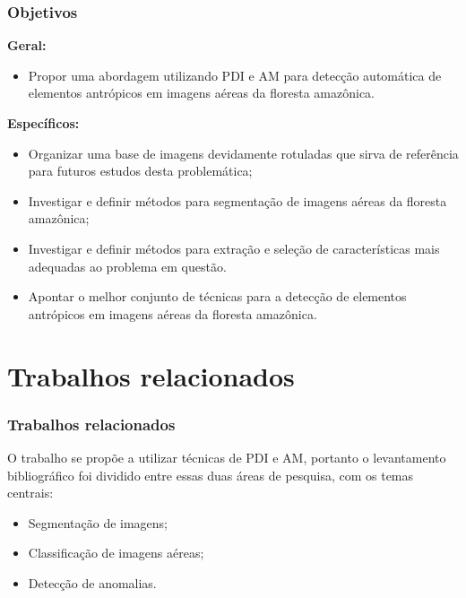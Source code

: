 \documentclass[t]{beamer}
\begin{document}
\begin{frame}[c]
\frametitle{Objetivos}

\textbf{Geral:}

\begin{itemize}
	\item Propor uma abordagem utilizando PDI e AM para detecção automática de elementos antrópicos em imagens aéreas da floresta amazônica.
\end{itemize}

\textbf{Específicos:}

\begin{itemize}
    \item Organizar uma base de imagens devidamente rotuladas que sirva de referência para futuros estudos desta problemática;
    \item Investigar e definir métodos para segmentação de imagens aéreas da floresta amazônica;
    \item Investigar e definir métodos para extração e seleção de características mais adequadas ao problema em questão.
    \item Apontar o melhor conjunto de técnicas para a detecção de elementos antrópicos em imagens aéreas da floresta amazônica.
\end{itemize}

\end{frame}


\section{Trabalhos relacionados}

\begin{frame}[c]
	\frametitle{Trabalhos relacionados}

	O trabalho se propõe a utilizar técnicas de PDI e AM, portanto o levantamento bibliográfico foi dividido entre essas duas áreas de pesquisa, com os temas centrais:
	\vspace{0.5cm}
	\begin{itemize}
		\item Segmentação de imagens;
		\item Classificação de imagens aéreas;
		\item Detecção de anomalias.
	\end{itemize}
\end{frame}
\end{document}
